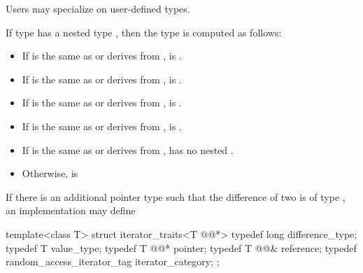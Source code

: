 \begin{addedblock}
\pnum
Users may specialize  on user-defined types.

\pnum
If type  has a nested type , then the
type  is computed as follows:
\begin{itemize}
\item If  is the same as or derives from ,
       is .
\item If  is the same as or derives from ,
       is .
\item If  is the same as or derives from ,
       is .
\item If  is the same as or derives from ,
       is .
\item If  is the same as or derives from ,
       has no nested .
\item Otherwise,  is 
\end{itemize}
\end{addedblock}

\begin{removedblock}
\pnum
\enternote
If there is an additional pointer type
such that the difference of two
is of type
,
an implementation may define

\begin{codeblock}
  template<class T> struct iterator_traits<T @@*> {
    typedef long difference_type;
    typedef T value_type;
    typedef T @@* pointer;
    typedef T @@& reference;
    typedef random_access_iterator_tag iterator_category;
  };
\end{codeblock}
\exitnote
\end{removedblock}

